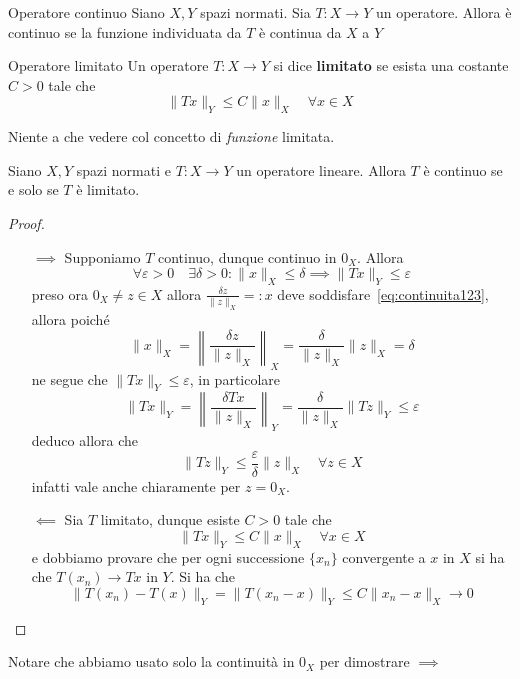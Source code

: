 \begin{definition}{Operatore continuo}
    Siano \(X, Y\) spazi normati. Sia \(T : X \to Y\) un operatore. Allora è
    continuo se la funzione individuata da \(T\) è continua da \(X\) a \(Y\) 
\end{definition}
\begin{definition}{Operatore limitato}
    Un operatore \(T : X \to Y\) si dice \textbf{limitato} se esista una
    costante \(C > 0\) tale che
    \[
      \|Tx\|_Y \le C\|x\|_X \quad \forall x \in X
    \]
\end{definition}
\begin{remark}
    Niente a che vedere col concetto di \emph{funzione} limitata.
\end{remark}
\begin{theorem}
    Siano \(X, Y\) spazi normati e \(T : X \to Y\) un operatore lineare. Allora
    \(T\) è continuo se e solo se \(T\) è limitato.
\end{theorem}
\begin{proof}\( \)
\begin{itemize}
    \item[\(\implies \)] Supponiamo \(T\) continuo, dunque continuo in \(0_X\). Allora
        \begin{equation}\label{eq:continuita123}
          \forall \varepsilon > 0 \quad \exists \delta > 0 : \|x\|_X \le  \delta
          \implies \|Tx\|_Y \le  \varepsilon
        \end{equation}
        preso ora \(0_X \neq z \in X\) allora \(\displaystyle \frac{\delta
        z}{\|z\|_X} =: x\) deve soddisfare~\ref{eq:continuita123}, allora poiché
        \[
            \|x\|_X = \left\| \frac{\delta z}{\|z\|_X} \right\|_X =
            \frac{\delta}{\|z\|_X} \|z\|_X = \delta
        \]
        ne segue che \(\|Tx\|_Y \le \varepsilon\), in particolare
        \[
            \|Tx\|_Y = \left\| \frac{\delta Tx}{\|z\|_X} \right\|_Y =
            \frac{\delta}{\|z\|_X} \|Tz\|_Y \le \varepsilon
        \]
        deduco allora che 
        \[
          \|Tz\|_Y \le \frac{\varepsilon}{\delta} \|z\|_X \quad \forall z \in X
        \]
        infatti vale anche chiaramente per \(z = 0_X\).
    \item[\(\impliedby \)] Sia \(T\) limitato, dunque esiste \(C > 0\) tale che 
        \[
          \| Tx\|_Y \le C \|x\|_X \quad \forall x \in X
        \]
        e dobbiamo provare che per ogni successione \(\{x_{n}\} \) convergente a
        \(x\) in \(X\)  si ha che \(T{(x_{n})} \to Tx\) in \(Y\). Si ha che
        \[
            \|T{(x_{n})} - T{(x)}\|_Y = \|T{(x_{n} - x)}\|_Y \le C \|x_{n} -
            x\|_X \to 0
        \]
\end{itemize}
\end{proof}
\begin{note}
    Notare che abbiamo usato solo la continuità in \(0_X\) per dimostrare \(\implies\) 
\end{note}


